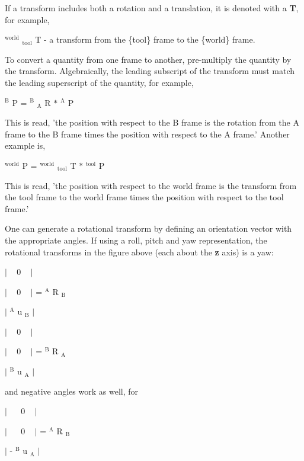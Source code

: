 If a transform includes both a rotation and a translation, it is denoted with a {\bfseries T}, for example,


\footnotesize $^{\mbox{world}}$ $_{\mbox{tool}}$ 
\normalsize T -\/ a transform from the \{tool\} frame to the \{world\} frame.

To convert a quantity from one frame to another, pre-\/multiply the quantity by the transform. Algebraically, the leading subscript of the transform must match the leading superscript of the quantity, for example,


\footnotesize $^{\mbox{B}}$ 
\normalsize P = 
\footnotesize $^{\mbox{B}}$ $_{\mbox{A}}$ 
\normalsize R $\ast$ 
\footnotesize $^{\mbox{A}}$ 
\normalsize P

This is read, 'the position with respect to the B frame is the rotation from the A frame to the B frame times the position with respect to the A frame.' Another example is,


\footnotesize $^{\mbox{world}}$ 
\normalsize P = 
\footnotesize $^{\mbox{world}}$ $_{\mbox{tool}}$ 
\normalsize T $\ast$ 
\footnotesize $^{\mbox{tool}}$ 
\normalsize P

This is read, 'the position with respect to the world frame is the transform from the tool frame to the world frame times the position with respect to the tool frame.'

One can generate a rotational transform by defining an orientation vector with the appropriate angles. If using a roll, pitch and yaw representation, the rotational transforms in the figure above (each about the {\bfseries z} axis) is a yaw\-:

$\vert$ ~ 0 ~ $\vert$ \par
 $\vert$ ~ 0 ~ $\vert$ = 
\footnotesize $^{\mbox{A}}$ 
\normalsize R
\footnotesize $_{\mbox{B}}$ 
\normalsize  \par
 $\vert$ 
\footnotesize $^{\mbox{A}}$ 
\normalsize u
\footnotesize $_{\mbox{B}}$ 
\normalsize  $\vert$

$\vert$ ~ 0 ~ $\vert$ \par
 $\vert$ ~ 0 ~ $\vert$ = 
\footnotesize $^{\mbox{B}}$ 
\normalsize R
\footnotesize $_{\mbox{A}}$ 
\normalsize  \par
 $\vert$ 
\footnotesize $^{\mbox{B}}$ 
\normalsize u
\footnotesize $_{\mbox{A}}$ 
\normalsize  $\vert$

and negative angles work as well, for

$\vert$ ~~ 0 ~ $\vert$ \par
 $\vert$ ~~ 0 ~ $\vert$ = 
\footnotesize $^{\mbox{A}}$ 
\normalsize R
\footnotesize $_{\mbox{B}}$ 
\normalsize  \par
 $\vert$ -\/
\footnotesize $^{\mbox{B}}$ 
\normalsize u
\footnotesize $_{\mbox{A}}$ 
\normalsize  $\vert$

